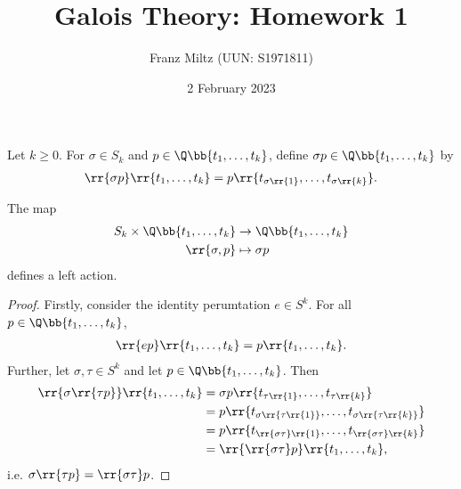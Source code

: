\documentclass{article}
\begin{document}
\title{Galois Theory: Homework 1}
\author{Franz Miltz (UUN: S1971811)}
\date{2 February 2023}
\maketitle

Let $k\geq 0$. For $\sigma\in S_k$ and $p\in\Q\bb{t_1,\ldots,t_k}$, define
$\sigma p\in\Q\bb{t_1,\ldots,t_k}$ by
\begin{align*}
  \rr{\sigma p}\rr{t_1,\ldots,t_k}=p\rr{t_{\sigma\rr{1}},\ldots,t_{\sigma\rr{k}}}.
\end{align*}

\begin{claim*}[i]
  The map
  \begin{align*}
    S_k \times\Q\bb{t_1,\ldots,t_k}&\to\Q\bb{t_1,\ldots,t_k}\\
    \rr{\sigma,p}&\mapsto\sigma p
  \end{align*}
  defines a left action.
  \begin{proof}
    Firstly, consider the identity perumtation $e\in S^k$. For all $p\in\Q\bb{t_1,\ldots,t_k}$,
    \begin{align*}
      \rr{ep}\rr{t_1,\ldots,t_k}=p\rr{t_1,\ldots,t_k}.
    \end{align*}
    Further, let $\sigma,\tau\in S^k$ and let $p\in\Q\bb{t_1,\ldots,t_k}$. Then
    \begin{align*}
      \rr{\sigma\rr{\tau p}}\rr{t_1,\ldots,t_k}
      &= \sigma p\rr{t_{\tau\rr{1}},\ldots,t_{\tau\rr{k}}}\\
      &= p\rr{t_{\sigma\rr{\tau\rr{1}}},\ldots,t_{\sigma\rr{\tau\rr{k}}}}\\
      &= p\rr{t_{\rr{\sigma\tau}\rr{1}},\ldots,t_{\rr{\sigma\tau}\rr{k}}}\\
      &= \rr{\rr{\sigma\tau}p}\rr{t_1,\ldots,t_k},
    \end{align*}
    i.e. $\sigma\rr{\tau p}=\rr{\sigma \tau}p$.
  \end{proof}
\end{claim*}
\end{document}
